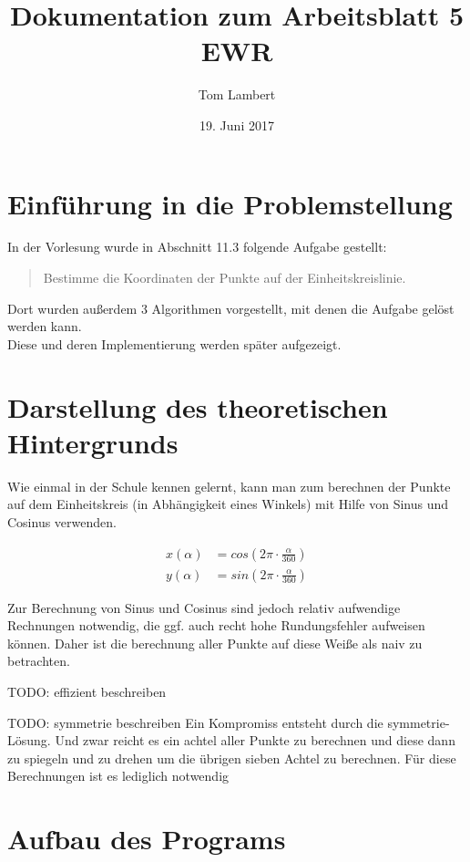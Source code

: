 \documentclass{scrartcl}
\title{Dokumentation zum Arbeitsblatt 5 EWR}
\author{Tom Lambert}
\date{19. Juni 2017}
\begin{document}
	
	\maketitle
	\tableofcontents
	
	\section{Einführung in die Problemstellung}
	
	In der Vorlesung wurde in Abschnitt 11.3 folgende Aufgabe gestellt:
	
	\begin{quote}
		Bestimme die Koordinaten der Punkte auf der Einheitskreislinie.
	\end{quote}
	
	Dort wurden außerdem 3 Algorithmen vorgestellt, mit denen die Aufgabe gelöst werden kann. \\
	Diese und deren Implementierung werden später aufgezeigt.
	
	
	
	\section{Darstellung des theoretischen Hintergrunds}
	
	Wie einmal in der Schule kennen gelernt, kann man zum berechnen der Punkte auf dem Einheitskreis (in Abhängigkeit eines Winkels) mit Hilfe von Sinus und Cosinus verwenden.
	
	\begin{align}
		x(\alpha) &= cos(2\pi\cdot \frac{\alpha}{360}) \\
		y(\alpha) &= sin(2\pi\cdot \frac{\alpha}{360})
	\end{align}
	
	Zur Berechnung von Sinus und Cosinus sind jedoch relativ aufwendige Rechnungen notwendig, die ggf. auch recht hohe Rundungsfehler aufweisen können. Daher ist die berechnung aller Punkte auf diese Weiße als naiv zu betrachten.
	
	TODO: effizient beschreiben
	
	TODO: symmetrie beschreiben
	Ein Kompromiss entsteht durch die symmetrie-Lösung. Und zwar reicht es ein achtel aller Punkte zu berechnen und diese dann zu spiegeln und zu drehen um die übrigen sieben Achtel zu berechnen. Für diese Berechnungen ist es lediglich notwendig 
	
	
	\section{Aufbau des Programs}
	
\end{document}
